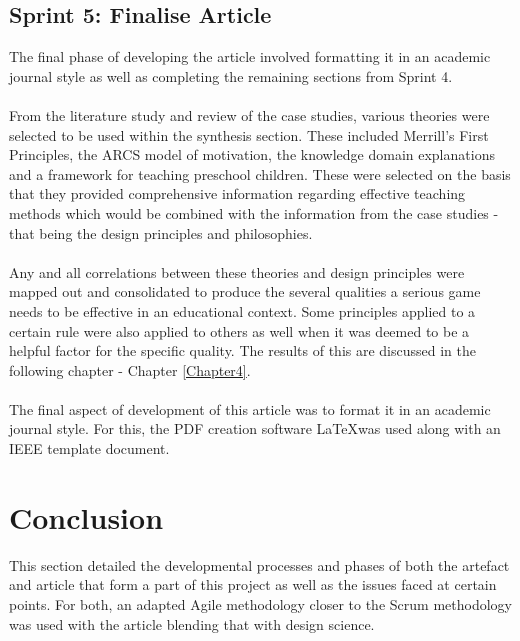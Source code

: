 \subsection{Sprint 5: Finalise Article}
The final phase of developing the article involved formatting it in an academic journal style as well as completing the remaining sections from Sprint 4. 
\\\\
From the literature study and review of the case studies, various theories were selected to be used within the synthesis section. These included Merrill's First Principles, the ARCS model of motivation, the knowledge domain explanations and a framework for teaching preschool children. These were selected on the basis that they provided comprehensive information regarding effective teaching methods which would be combined with the information from the case studies - that being the design principles and philosophies. 
\\\\
Any and all correlations between these theories and design principles were mapped out and consolidated to produce the several qualities a serious game needs to be effective in an educational context. Some principles applied to a certain rule were also applied to others as well when it was deemed to be a helpful factor for the specific quality. The results of this are discussed in the following chapter - Chapter \ref{Chapter4}.
\\\\ 
The final aspect of development of this article was to format it in an academic journal style. For this, the PDF creation software \LaTeX was used along with an IEEE template document.





\section{Conclusion}
This section detailed the developmental processes and phases of both the artefact and article that form a part of this project as well as the issues faced at certain points. For both, an adapted Agile methodology closer to the Scrum methodology was used with the article blending that with design science.